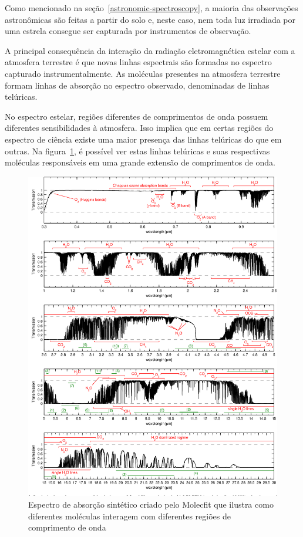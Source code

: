 Como mencionado na seção~\ref{astronomic-spectroscopy}, a maioria das observações astronômicas são feitas a partir do solo e, neste caso, nem toda luz irradiada por uma estrela consegue ser capturada por instrumentos de observação. 

A principal consequência da interação da radiação eletromagnética estelar com a atmosfera terrestre é que novas linhas espectrais são formadas no espectro capturado instrumentalmente. As moléculas presentes na atmosfera terrestre formam linhas de absorção no espectro observado, denominadas de linhas telúricas.  

No espectro estelar, regiões diferentes de comprimentos de onda possuem diferentes sensibilidades à atmosfera. Isso implica que em certas regiões do espectro de ciência existe uma maior presença das linhas telúricas do que em outras. Na figura~\ref{fig:molectfit-telluric-reference}, é possível ver estas linhas telúricas e suas respectivas moléculas responsáveis em uma grande extensão de comprimentos de onda.

\begin{figure}[!htb]
\centering
\includegraphics[width=15cm]{figuras/telluric_reference_molecfit.png}
\caption{Espectro de absorção sintético criado pelo Molecfit que ilustra como diferentes moléculas interagem com diferentes regiões de comprimento de onda \citep{smette2015molecfit}}
\label{fig:molectfit-telluric-reference}
\end{figure}

